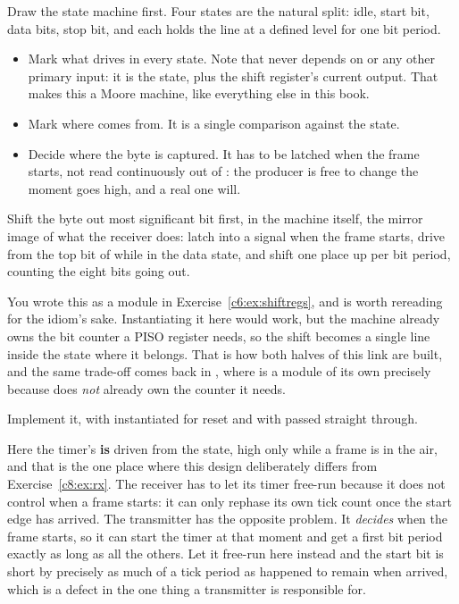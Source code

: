  Draw the state machine first. Four states are the natural split: idle, start bit, data
bits, stop bit, and each holds the line at a defined level for one bit period.
\begin{itemize}
  \item Mark what drives  in every state. Note that  never depends on 
    or any other primary input: it is the state, plus the shift register's current output. That makes
    this a Moore machine, like everything else in this book.
  \item Mark where  comes from. It is a single comparison against the state.
  \item Decide where the byte is captured. It has to be latched when the frame starts, not read
    continuously out of : the producer is free to change  the moment
     goes high, and a real one will.
\end{itemize}

 Shift the byte out most significant bit first, in the machine itself, the mirror image of
what the receiver does: latch  into a signal  when the frame starts, drive
 from the top bit of  while in the data state, and shift  one place
up per bit period, counting the eight bits going out.

You wrote this as a module in Exercise~\ref{c6:ex:shiftregs}, and  is worth rereading for
the idiom's sake. Instantiating it here would work, but the machine already owns the bit counter a
PISO register needs, so the shift becomes a single line inside the state where it belongs. That is
how both halves of this link are built, and the same trade-off comes back in , where
 is a module of its own precisely because  does \emph{not}
already own the counter it needs.

 Implement it, with  instantiated for reset and  with
 passed straight through.

Here the timer's  \textbf{is} driven from the state, high only while a frame is in the
air, and that is the one place where this design deliberately differs from Exercise~\ref{c8:ex:rx}.
The receiver has to let its timer free-run because it does not control when a frame starts: it can
only rephase its own tick count once the start edge has arrived. The transmitter has the opposite
problem. It \emph{decides} when the frame starts, so it can start the timer at that moment and get a
first bit period exactly as long as all the others. Let it free-run here instead and the start bit is
short by precisely as much of a tick period as happened to remain when  arrived, which is
a defect in the one thing a transmitter is responsible for.

